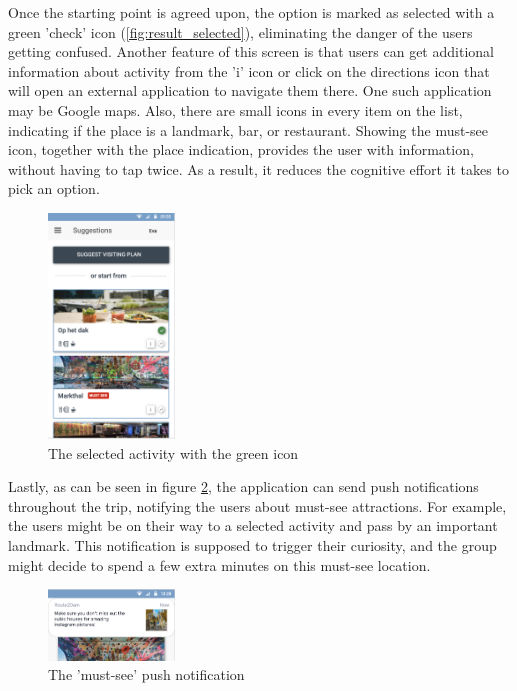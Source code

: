 \documentclass[11pt,a4paper,oneside]{article}
\begin{document}
Once the starting point is agreed upon, the option is marked as selected with a green 'check' icon (\autoref{fig:result_selected}), eliminating the danger of the users getting confused. Another feature of this screen is that users can get additional information about activity from the 'i' icon or click on the directions icon that will open an external application to navigate them there. One such application may be Google maps. Also, there are small icons in every item on the list, indicating if the place is a landmark, bar, or restaurant. Showing the must-see icon, together with the place indication, provides the user with information, without having to tap twice. As a result, it reduces the cognitive effort it takes to pick an option.

\begin{figure}[H]
    \centering
    \includegraphics[width=0.3\textwidth]{paper/imgs/hifi_prototypes/result_selected.png}
    \caption{The selected activity with the green icon}
    \label{fig:result_selected}
\end{figure}

Lastly, as can be seen in figure \ref{fig:must_see}, the application can send push notifications throughout the trip, notifying the users about must-see attractions. For example, the users might be on their way to a selected activity and pass by an important landmark. This notification is supposed to trigger their curiosity, and the group might decide to spend a few extra minutes on this must-see location.

\begin{figure}[H]
    \centering
    \includegraphics[width=0.3\textwidth]{paper/imgs/hifi_prototypes/push_notification_must_see.png}
    \caption{The 'must-see' push notification}
    \label{fig:must_see}
\end{figure}
\end{document}
